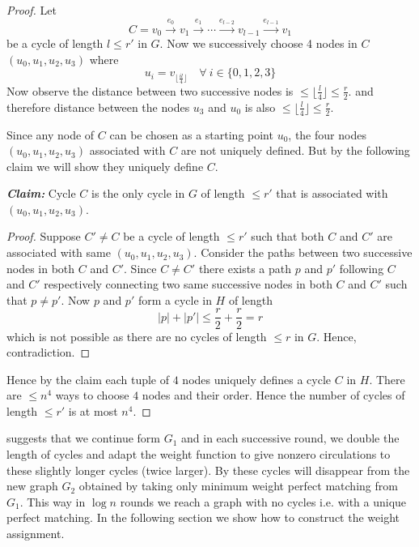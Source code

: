 \begin{proof}
	Let $$C=v_0\overset{e_0}{\longrightarrow}v_1\overset{e_1}{\longrightarrow}\cdots \overset{e_{l-2}}{\longrightarrow}v_{l-1}\overset{e_{l-1}}{\longrightarrow}v_1$$be a cycle of length $l\leq r'$ in $G$. Now we successively choose 4 nodes in $C$ $(u_0,u_1,u_2,u_3)$ where $$u_i=v_{\lfloor \frac{il}4\rfloor}\quad \forall\ i\in \{0,1,2,3\}$$Now observe the distance between two successive nodes is $\leq \lfloor \frac{l}{4}\rfloor \leq \frac{r}{2}$. and therefore distance between the nodes $u_3$ and $u_0$ is  also $\leq \lfloor \frac{l}4\rfloor\leq \frac{r}{2}$.

	Since any node of $C$ can be chosen as a starting point $u_0$, the four nodes $(u_0,u_1,u_2,u_3)$ associated with $C$ are not uniquely defined. But by the following claim we will show they uniquely define $C$.\parinf\vspace*{2mm}

	\textbf{\textit{Claim:}} Cycle $C$ is the only cycle in $G$ of length $\leq r'$ that is associated with $(u_0,u_1,u_2,u_3)$.\parinn

	\begin{proof}
		Suppose $C'\neq C$ be a cycle of length $\leq r'$ such that both $C$ and $C'$ are associated with same $(u_0, u_1,u_2, u_3)$. Consider the paths between two successive nodes in both $C$ and $C'$. Since $C\neq C'$ there exists a path $p$ and $p'$ following $C$ and $C'$ respectively connecting two same successive nodes in both $C$ and $C'$ such that $p\neq p'$. Now $p$ and $p'$ form a cycle in $H$ of length $$|p|+|p'|\leq\frac{r}{2}+\frac{r}{2}=r$$which is not possible as there are no cycles of length $\leq r$ in $G$. Hence, contradiction.
	\end{proof}
	Hence by the claim each tuple of $4$ nodes uniquely defines a cycle $C$ in $H$. There are $\leq n^4$ ways to choose $4$ nodes and their order. Hence the number of cycles of length $\leq r'$ is at most $n^4$.
\end{proof}

 suggests that we continue form $G_1$ and in each successive round, we double the length of cycles and adapt the weight function to give nonzero circulations to these slightly longer cycles (twice larger). By  these cycles will disappear from the new graph $G_2$ obtained by taking only minimum weight perfect matching from $G_1$. This way in $\log n$ rounds we reach a graph with no cycles i.e. with a unique perfect matching. In the following section we show how to construct the weight assignment.
